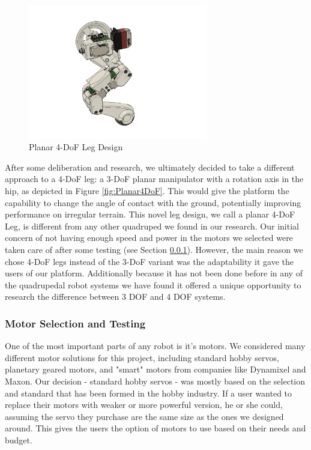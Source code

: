                 \begin{figure}[H]
                    \centering
                    \includegraphics[width=0.7\textwidth]{figures/4dof.png}
                    \caption{Planar 4-DoF Leg Design}
                    \label{fig:4DoFDesign}
                \end{figure}
                
            After some deliberation and research, we ultimately decided to take a different approach to a 4-DoF leg: a 3-DoF planar manipulator with a rotation axis in the hip, as depicted in Figure \ref{fig:Planar4DoF}. This would give the platform the capability to change the angle of contact with the ground, potentially improving performance on irregular terrain. This novel leg design, we call a planar 4-DoF Leg, is different from any other quadruped we found in our research. Our initial concern of not having enough speed and power in the motors we selected were taken care of after some testing (see Section \ref{subsubsec:MotorSelection}). However, the main reason we chose 4-DoF legs instead of the 3-DoF variant was the adaptability it gave the users of our platform. Additionally because it has not been done before in any of the quadrupedal robot systems we have found it offered a unique opportunity to research the difference between 3 DOF and 4 DOF systems. 
            
        \subsubsection{Motor Selection and Testing}\label{subsubsec:MotorSelection}
        One of the most important parts of any robot is it's motors. We considered many different motor solutions for this project, including standard hobby servos, planetary geared motors, and "smart" motors from companies like Dynamixel and Maxon. Our decision - standard hobby servos - was mostly based on the selection and standard that has been formed in the hobby industry. If a user wanted to replace their motors with weaker or more powerful version, he or she could, assuming the servo they purchase are the same size as the ones we designed around. This gives the users the option of motors to use based on their needs and budget. 
